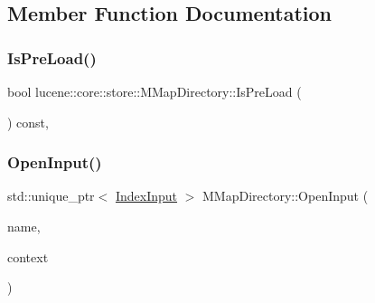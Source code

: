 \subsection{Member Function Documentation}
\mbox{\label{classlucene_1_1core_1_1store_1_1MMapDirectory_af463dc9e012f72c23e7f29899f57464e}} 
\subsubsection{\texorpdfstring{Is\+Pre\+Load()}{IsPreLoad()}}
{\footnotesize\ttfamily bool lucene\+::core\+::store\+::\+M\+Map\+Directory\+::\+Is\+Pre\+Load (\begin{DoxyParamCaption}{ }\end{DoxyParamCaption}) const\hspace{0.3cm}{\ttfamily [inline]}, {\ttfamily [noexcept]}}

\mbox{\label{classlucene_1_1core_1_1store_1_1MMapDirectory_ab69c2621677342be11820cb290ac8a4b}} 
\subsubsection{\texorpdfstring{Open\+Input()}{OpenInput()}}
{\footnotesize\ttfamily std\+::unique\+\_\+ptr$<$ \mbox{\hyperlink{classlucene_1_1core_1_1store_1_1IndexInput}{Index\+Input}} $>$ M\+Map\+Directory\+::\+Open\+Input (\begin{DoxyParamCaption}\item[{\mbox{\hyperlink{ZlibCrc32_8h_a2c212835823e3c54a8ab6d95c652660e}{const}} std\+::string \&}]{name,  }\item[{\mbox{\hyperlink{ZlibCrc32_8h_a2c212835823e3c54a8ab6d95c652660e}{const}} \mbox{\hyperlink{classlucene_1_1core_1_1store_1_1IOContext}{I\+O\+Context}} \&}]{context }\end{DoxyParamCaption})\hspace{0.3cm}{\ttfamily [virtual]}}



